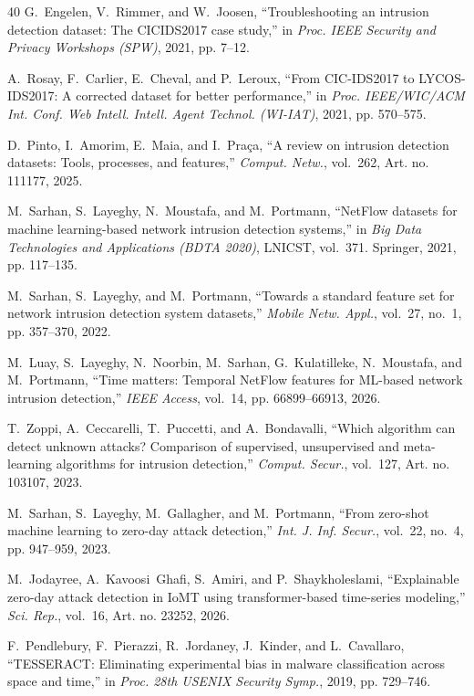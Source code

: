 \begin{thebibliography}{40}
G.~Engelen, V.~Rimmer, and W.~Joosen, ``Troubleshooting an intrusion detection dataset: The CICIDS2017 case study,'' in \emph{Proc. IEEE Security and Privacy Workshops (SPW)}, 2021, pp. 7--12.

A.~Rosay, F.~Carlier, E.~Cheval, and P.~Leroux, ``From CIC-IDS2017 to LYCOS-IDS2017: A corrected dataset for better performance,'' in \emph{Proc. IEEE/WIC/ACM Int. Conf. Web Intell. Intell. Agent Technol. (WI-IAT)}, 2021, pp. 570--575.

D.~Pinto, I.~Amorim, E.~Maia, and I.~Pra\c{c}a, ``A review on intrusion detection datasets: Tools, processes, and features,'' \emph{Comput. Netw.}, vol.~262, Art. no. 111177, 2025.

M.~Sarhan, S.~Layeghy, N.~Moustafa, and M.~Portmann, ``NetFlow datasets for machine learning-based network intrusion detection systems,'' in \emph{Big Data Technologies and Applications (BDTA 2020)}, LNICST, vol.~371. Springer, 2021, pp. 117--135.

M.~Sarhan, S.~Layeghy, and M.~Portmann, ``Towards a standard feature set for network intrusion detection system datasets,'' \emph{Mobile Netw. Appl.}, vol.~27, no.~1, pp. 357--370, 2022.

M.~Luay, S.~Layeghy, N.~Noorbin, M.~Sarhan, G.~Kulatilleke, N.~Moustafa, and M.~Portmann, ``Time matters: Temporal NetFlow features for ML-based network intrusion detection,'' \emph{IEEE Access}, vol.~14, pp. 66899--66913, 2026.

T.~Zoppi, A.~Ceccarelli, T.~Puccetti, and A.~Bondavalli, ``Which algorithm can detect unknown attacks? Comparison of supervised, unsupervised and meta-learning algorithms for intrusion detection,'' \emph{Comput. Secur.}, vol.~127, Art. no. 103107, 2023.

M.~Sarhan, S.~Layeghy, M.~Gallagher, and M.~Portmann, ``From zero-shot machine learning to zero-day attack detection,'' \emph{Int. J. Inf. Secur.}, vol.~22, no.~4, pp. 947--959, 2023.

M.~Jodayree, A.~Kavoosi~Ghafi, S.~Amiri, and P.~Shaykholeslami, ``Explainable zero-day attack detection in IoMT using transformer-based time-series modeling,'' \emph{Sci. Rep.}, vol.~16, Art. no. 23252, 2026.

F.~Pendlebury, F.~Pierazzi, R.~Jordaney, J.~Kinder, and L.~Cavallaro, ``TESSERACT: Eliminating experimental bias in malware classification across space and time,'' in \emph{Proc. 28th USENIX Security Symp.}, 2019, pp. 729--746.


\end{thebibliography}
